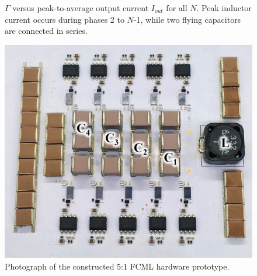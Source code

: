 \begin{figure}[b]
\begin{minipage}{0.36\linewidth}
    \caption{$\Gamma$ versus peak-to-average output current $I_{out}$ for all $N$. Peak inductor current occurs during phases 2 to $N$-1, while two flying capacitors are connected in series.}
    \label{fig:ResonantFCML__Gamma_v_IpkIout_all}
\end{minipage}
\hfill
\begin{minipage}{0.3\linewidth}
  \centering
    \includegraphics[width=1\linewidth]{Figures/PCB_FCML_annotated.png}
    \caption{Photograph of the constructed 5:1 FCML hardware prototype.}
    \label{fig:board}


\end{minipage}
\end{figure}
